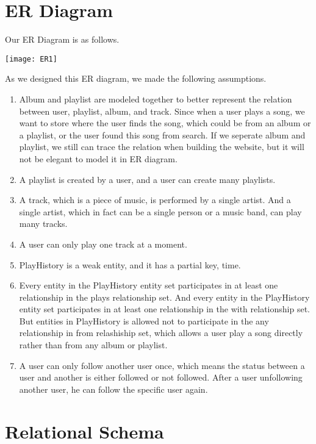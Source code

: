 \documentclass[letterpaper, 12pt]{report}
\begin{document}
	\section{ER Diagram}
	Our ER Diagram is as follows.
	\begin{center}
	\texttt{[image: ER1]}
	\end{center}
	As we designed this ER diagram, we made the following assumptions.
	\begin{enumerate}
		\item 
		Album and playlist are modeled together to better represent the relation between user, playlist, album, and track. Since when a user plays a song, we want to store where the user finds the song, which could be from an album or a playlist, or the user found this song from search. If we seperate album and playlist, we still can trace the relation when building the website, but it will not be elegant to model it in ER diagram.
		\item 
		A playlist is created by a user, and a user can create many playlists.
		\item 
		A track, which is a piece of music, is performed by a single artist. And a single artist, which in fact can be a single person or a music band, can play many tracks.
		\item 
		A user can only play one track at a moment.
		\item 
		PlayHistory is a weak entity, and it has a partial key, time.
		\item 
		Every entity in the PlayHistory entity set participates in at least one relationship in the plays relationship set. And every entity in the PlayHistory entity set participates in at least one relationship in the with relationship set. But entities in PlayHistory is allowed not to participate in the any relationship in from relashiship set, which allows a user play a song directly rather than from any album or playlist.
		\item 
		A user can only follow another user once, which means the status between a user and another is either followed or not followed. After a user unfollowing another user, he can follow the specific user again.
	\end{enumerate}
	\section{Relational Schema}
\end{document}
